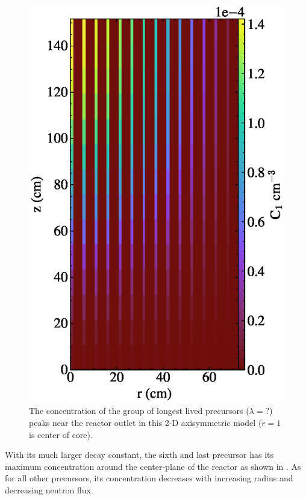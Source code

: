 \documentclass{article}
\begin{document}
\begin{figure}
  \centering
  \includegraphics{auto_diff_rho_pre1.eps}
        \caption{The concentration of the group of longest lived precursors 
        ($\lambda = ?$) peaks near the reactor outlet
        in this 2-D axisymmetric model ($r=1$ is center of core).}
  \label{fig:pre1}
\end{figure}

With its much larger decay constant, the sixth and last precursor has its
maximum concentration around the center-plane of the reactor as shown in
. As for all other precursors, its concentration decreases with
increasing radius and decreasing neutron flux.
\end{document}
